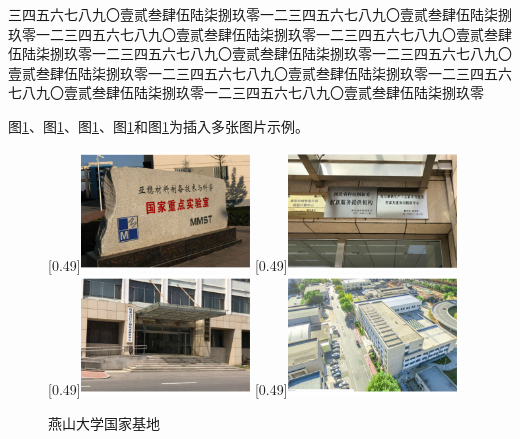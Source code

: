 \documentclass[master,academic]{ysuthesis} %
\begin{document}
		三四五六七八九〇壹贰叁肆伍陆柒捌玖零一二三四五六七八九〇壹贰叁肆伍陆柒捌玖零一二三四五六七八九〇壹贰叁肆伍陆柒捌玖零一二三四五六七八九〇壹贰叁肆伍陆柒捌玖零一二三四五六七八九〇壹贰叁肆伍陆柒捌玖零一二三四五六七八九〇壹贰叁肆伍陆柒捌玖零一二三四五六七八九〇壹贰叁肆伍陆柒捌玖零一二三四五六七八九〇壹贰叁肆伍陆柒捌玖零一二三四五六七八九〇壹贰叁肆伍陆柒捌玖零

		图\ref{fig_ysunationalbase}、图\ref{fig_ysunationalbase}、图\ref{fig_ysunationalbase}、图\ref{fig_ysunationalbase}和图\ref{fig_ysunationalbase}为插入多张图片示例。

			\begin{figure}[!ht]
				\centering
				[0.49\textwidth]{\includegraphics[width=0.4\textwidth]{亚稳材料制备技术与科学国家重点实验室.pdf}}
				[0.49\textwidth]{\includegraphics[width=0.4\textwidth]{精品钢铁生产工艺装备智能化省部共建协同创新中心.pdf}}
				[0.49\textwidth]{\includegraphics[width=0.4\textwidth]{国家创新人才培养示范基地.pdf}}
				[0.49\textwidth]{\includegraphics[width=0.4\textwidth]{国家冷轧板带装备及工艺工程技术研究中心.pdf}}
				\caption{燕山大学国家基地}
				\label{fig_ysunationalbase}
			\end{figure}
			
\end{document}
